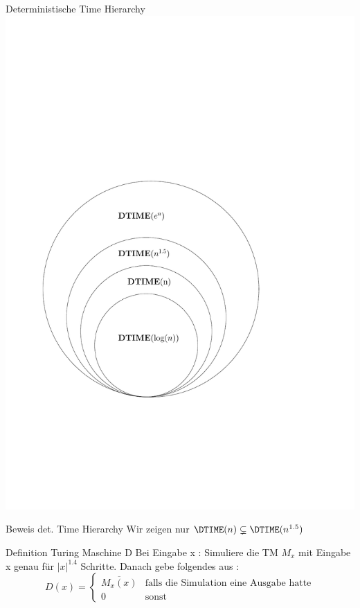 \begin{frame}{Deterministische Time Hierarchy}
	\includegraphics[scale=0.5]{images/timehierarchy.pdf}
\end{frame}

\begin{frame}{Beweis det. Time Hierarchy}
	Wir zeigen nur $\DTIME(n) \subsetneq \DTIME(n^{1.5})$
	\pause
	\begin{block}{Definition Turing Maschine D} 
		Bei Eingabe x : Simuliere die TM $M_x$ mit Eingabe x genau für $|x|^{1.4}$ 						Schritte. Danach gebe folgendes aus :
		\begin{equation}
		D(x) = 
		\begin{cases}
			\overline{M_x(x)} & \text{falls die Simulation eine Ausgabe hatte} \\
			0 & \text{sonst}
			
		\end{cases}
		\end{equation}			
	\end{block}
\end{frame}
